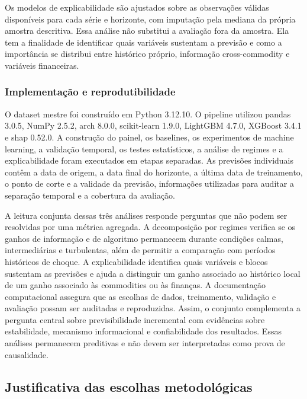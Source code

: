 \documentclass[a4paper,fleqn]{cas-sc}
\begin{document}
Os modelos de explicabilidade são ajustados sobre as observações válidas disponíveis para cada série e horizonte, com imputação pela mediana da própria amostra descritiva. Essa análise não substitui a avaliação fora da amostra. Ela tem a finalidade de identificar quais variáveis sustentam a previsão e como a importância se distribui entre histórico próprio, informação cross-commodity e variáveis financeiras.

\subsubsection{Implementação e reprodutibilidade}
\label{subsec:reproducibility}

O dataset mestre foi construído em Python 3.12.10. O pipeline utilizou pandas 3.0.5, NumPy 2.5.2, arch 8.0.0, scikit-learn 1.9.0, LightGBM 4.7.0, XGBoost 3.4.1 e shap 0.52.0. A construção do painel, os baselines, os experimentos de machine learning, a validação temporal, os testes estatísticos, a análise de regimes e a explicabilidade foram executados em etapas separadas. As previsões individuais contêm a data de origem, a data final do horizonte, a última data de treinamento, o ponto de corte e a validade da previsão, informações utilizadas para auditar a separação temporal e a cobertura da avaliação.

A leitura conjunta dessas três análises responde perguntas que não podem ser resolvidas por uma métrica agregada. A decomposição por regimes verifica se os ganhos de informação e de algoritmo permanecem durante condições calmas, intermediárias e turbulentas, além de permitir a comparação com períodos históricos de choque. A explicabilidade identifica quais variáveis e blocos sustentam as previsões e ajuda a distinguir um ganho associado ao histórico local de um ganho associado às commodities ou às finanças. A documentação computacional assegura que as escolhas de dados, treinamento, validação e avaliação possam ser auditadas e reproduzidas. Assim, o conjunto complementa a pergunta central sobre previsibilidade incremental com evidências sobre estabilidade, mecanismo informacional e confiabilidade dos resultados. Essas análises permanecem preditivas e não devem ser interpretadas como prova de causalidade.

\subsection{Justificativa das escolhas metodológicas}
\label{subsec:methodological_rationale}
\end{document}
